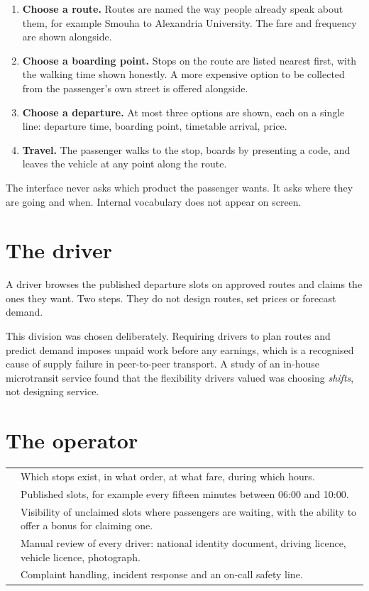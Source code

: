 \begin{enumerate}[label=\textbf{\arabic*.}]
\item \textbf{Choose a route.} Routes are named the way people already speak about them, for example
      Smouha to Alexandria University. The fare and frequency are shown alongside.
\item \textbf{Choose a boarding point.} Stops on the route are listed nearest first, with the
      walking time shown honestly. A more expensive option to be collected from the passenger's own
      street is offered alongside.
\item \textbf{Choose a departure.} At most three options are shown, each on a single line: departure
      time, boarding point, timetable arrival, price.
\item \textbf{Travel.} The passenger walks to the stop, boards by presenting a code, and leaves the
      vehicle at any point along the route.
\end{enumerate}

The interface never asks which product the passenger wants. It asks where they are going and when.
Internal vocabulary does not appear on screen.

\section{The driver}

A driver browses the published departure slots on approved routes and claims the ones they want.
Two steps. They do not design routes, set prices or forecast demand.

This division was chosen deliberately. Requiring drivers to plan routes and predict demand imposes
unpaid work before any earnings, which is a recognised cause of supply failure in peer-to-peer
transport. A study of an in-house microtransit service found that the flexibility drivers valued was
choosing \emph{shifts}, not designing service.

\section{The operator}

\begin{center}
\begin{tabularx}{\textwidth}{@{}L{44mm}Y@{}}
\toprule
{} & Which stops exist, in what order, at what fare, during which hours. \\
 & Published slots, for example every fifteen minutes between 06:00 and 10:00. \\
 & Visibility of unclaimed slots where passengers are waiting, with the ability to offer a bonus for claiming one. \\
 & Manual review of every driver: national identity document, driving licence, vehicle licence, photograph. \\
 & Complaint handling, incident response and an on-call safety line. \\
\bottomrule
\end{tabularx}
\end{center}

